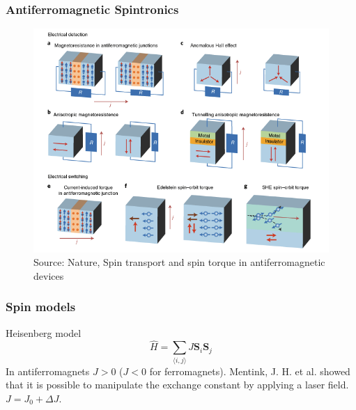 \documentclass{beamer}
\newcommand{\bs}[1] {\boldsymbol{#1}}
\begin{document}
\begin{frame}
\frametitle{Antiferromagnetic Spintronics}

\begin{figure}
  \begin{minipage}[c]{0.6\textwidth}
    \includegraphics[width=\textwidth]{../Figures/afm_device.png}
  \end{minipage}\hfill
  \begin{minipage}[c]{0.2\textwidth}
    \caption{Source: Nature, Spin transport and spin torque in antiferromagnetic devices} \label{fig:2}
  \end{minipage}
\end{figure}

\end{frame}


\begin{frame}
\frametitle{Spin models}
\begin{block}{Heisenberg model}
\begin{equation} 
\hat{H} = \sum_{\langle i,j \rangle} J \bs{S}_i \bs{S}_j \nonumber
\end{equation}
In antiferromagnets $J > 0$ ($J < 0$ for ferromagnets). Mentink, J. H. et al. showed that it is possible to manipulate the exchange constant by applying a laser field. $J = J_0 + \Delta J$.
\end{block}
\end{frame}

\end{document}
